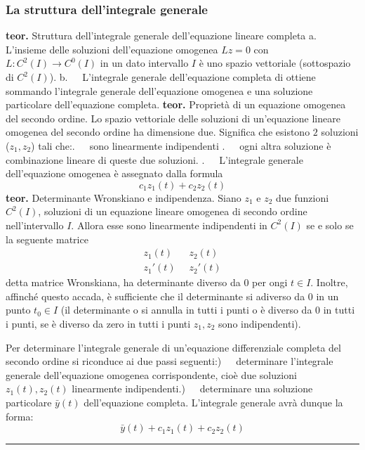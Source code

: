 \subsubsection{La struttura dell'integrale generale}
\textbf{teor.} Struttura dell'integrale generale dell'equazione lineare completa \newline
a. $\;\;\;$ L'insieme delle soluzioni dell'equazione omogenea $Lz = 0 $ con $L:C^2(I)\rightarrow C^0(I)$ in un dato intervallo $I$ è uno spazio vettoriale (sottospazio di $C^2(I)$).\newline
b. $\;\;\;$ L'integrale generale dell'equazione completa di ottiene sommando l'integrale generale dell'equazione omogenea e una soluzione particolare dell'equazione completa.\newline
\newline
\textbf{teor.} Proprietà di un equazione omogenea del secondo ordine.\newline
Lo spazio vettoriale delle soluzioni di un'equazione lineare omogenea del secondo ordine ha dimensione due.\newline
Significa che esistono $2$ soluzioni ($z_1, z_2$) tali che:. $\;\;\;$ sono linearmente indipendenti . $\;\;\;$ ogni altra soluzione è combinazione lineare di queste due soluzioni. . $\;\;\;$ L'integrale generale dell'equazione omogenea è assegnato dalla formula
\[
    c_1 z_1(t) + c_2 z_2(t)
\]
\newline
\textbf{teor.} Determinante Wronskiano e indipendenza. \newline
Siano $z_1$ e $z_2$ due funzioni $C^2(I)$, soluzioni di un equazione lineare omogenea di secondo ordine nell'intervallo $I$. Allora esse sono linearmente indipendenti in $C^2(I)$ se e solo se la seguente matrice
\[
    \begin{matrix}
        z_1(t) \;\; & z_2(t)\\
        z_1'(t) \;\; & z_2'(t)
    \end{matrix}
\]
detta matrice Wronskiana, ha determinante diverso da $0$ per ongi $t \in I$. Inoltre, affinché questo accada, è sufficiente che il determinante si adiverso da $0$ in un punto $t_0 \in I$ (il determinante o si annulla in tutti i punti o è diverso da $0$ in tutti i punti, se è diverso da zero in tutti i punti $z_1, z_2$ sono indipendenti).
\begin{tcolorbox}
Per determinare l'integrale generale di un'equazione differenziale completa del secondo ordine si riconduce ai due passi seguenti:) $\;\;\;$ determinare l'integrale generale dell'equazione omogenea corrispondente, cioè due soluzioni $z_1(t), z_2(t)$ linearmente indipendenti.) $\;\;\;$ determinare una soluzione particolare $\bar{y}(t)$ dell'equazione completa.\newline
L'integrale generale avrà dunque la forma:
\[
    \bar{y}(t) + c_1 z_1(t) + c_2 z_2(t)
\]
\end{tcolorbox}
\rule{\textwidth}{0,4pt}

